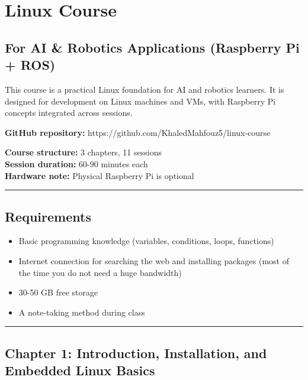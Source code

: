 \documentclass[
  english,
  paper=a4,
  oneside  ,captions=tableheading
]{scrartcl}
\author{}
\date{}
\title{}
\author{}
\date{}
\providecommand{\tightlist}{%
  \setlength{\itemsep}{0pt}\setlength{\parskip}{0pt}}
\begin{document}
\section{Linux Course}\label{linux-course}

\subsection{For AI \& Robotics Applications (Raspberry Pi +
ROS)}\label{for-ai-robotics-applications-raspberry-pi-ros}

This course is a practical Linux foundation for AI and robotics
learners. It is designed for development on Linux machines and VMs, with
Raspberry Pi concepts integrated across sessions.

\textbf{GitHub repository:}
https://github.com/KhaledMahfouz5/linux-course

\textbf{Course structure:} 3 chapters, 11 sessions\\
\textbf{Session duration:} 60-90 minutes each\\
\textbf{Hardware note:} Physical Raspberry Pi is optional

\begin{center}\rule{0.5\linewidth}{0.5pt}\end{center}

\subsection{Requirements}\label{requirements}

\begin{itemize}
\tightlist
\item
  Basic programming knowledge (variables, conditions, loops, functions)
\item
  Internet connection for searching the web and installing packages
  (most of the time you do not need a huge bandwidth)
\item
  30-50 GB free storage
\item
  A note-taking method during class
\end{itemize}

\begin{center}\rule{0.5\linewidth}{0.5pt}\end{center}

\subsection{Chapter 1: Introduction, Installation, and Embedded Linux
Basics}\label{chapter-1-introduction-installation-and-embedded-linux-basics}
\end{document}
